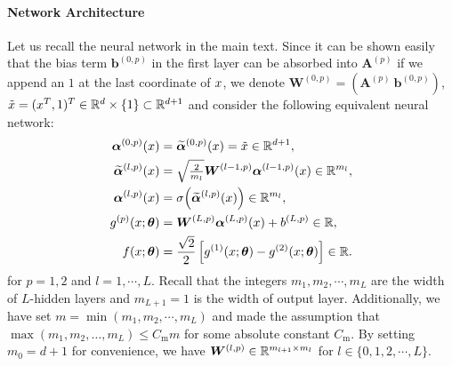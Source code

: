 \paragraph{Network Architecture} Let us recall the neural network in the main text.
Since it can be shown easily that the bias term $\bm{b}^{(0,p)}$ in the first layer can be absorbed into $\bm{A}^{(p)}$
if we append an $1$ at the last coordinate of $x$,
we denote $\bm{W}^{(0,p)}=(\bm{A}^{(p)}~\bm{b}^{(0,p)})$, $\tilde{x}=(x^T,1)^T\in\mathbb{R}^d \times \{1\}\subset\mathbb{R}^{d+1}$
and consider the following equivalent neural network:
\begin{align}
  \label{eq:A_NN_Arch}
  \begin{split}
    \bm{\alpha}^{(0,p)}(\x)&=\widetilde{\bm{\alpha}}^{(0,p)}(\x)=\tilde{\x}\in\mb{R}^{d+1},\\
    \widetilde{\bm{\alpha}}^{(l,p)}(\x) & = \sqrt{\tfrac{2}{m_{l}}} \bm{W}^{(l-1,p)}{\bm{\alpha}}^{(l-1,p)}(\x)\in\mb{R}^{m_l},\\
    {\bm{\alpha}}^{(l,p)}(\x)&=\sigma\xkm{\widetilde{\bm{\alpha}}^{(l,p)}(\x)}\in\mb{R}^{m_l},\\
    g^{(p)}(\x;\bm{\theta}) & = \bm{W}^{(L,p)}{\bm{\alpha}}^{(L,p)}(\x)+b^{(L,p)}\in\mb{R},\\
    f(\x;\bm{\theta}) &= \frac{\sqrt{2}}{2}\zk{ g^{(1)}(\x;\bm{\theta}) - g^{(2)}(\x;\bm{\theta}) }\in\mb{R}.
  \end{split}
\end{align}
for $p=1,2$ and $l=1,\cdots,L$.
Recall that the integers $m_1,m_2,\cdots, m_L$ are the width of $L$-hidden layers and $m_{L+1} = 1$ is the width of output layer.
Additionally, we have set $m = \min(m_1,m_2,\cdots,m_L)$ and made the assumption that $\max(m_1,m_2,\dots,m_{L}) \leq C_{\mathrm{m}} m$ for some absolute constant $C_{\mathrm{m}}$.
By setting $m_0=d+1$ for convenience, we have $\bm{W}^{(l,p)} \in \mathbb{R}^{m_{l+1} \times m_l}$ for $l\in\{0,1,2,\cdots,L\}$.

